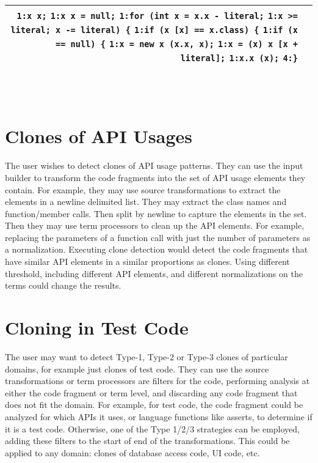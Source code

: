 \documentclass[]{article}
\begin{document}
\begin{minipage}{\textwidth}
\begin{tabular}{rp{12.5cm}}
			\verb|1:x x;|\newline
			\verb|1:x x = null;|\newline
			\verb|1:for (int x = x.x - literal;|\newline
			\verb|1:x >= literal; x -= literal) {|\newline
			\verb|1:if (x [x] == x.class) {|\newline
			\verb|1:if (x == null) {|\newline
			\verb|1:x = new x (x.x, x);|\newline
			\verb|1:x = (x) x [x + literal];|\newline
			\verb|1:x.x (x);|\newline
			\verb|4:}| \\
			\bottomrule[2pt]
		\end{tabular}
	\end{minipage}\\\\
	
	\newpage
	\section{Clones of API Usages}
	The user wishes to detect clones of API usage patterns.  They can use the input builder to transform the code fragments into the set of API usage elements they contain.  For example, they may use source transformations to extract the elements in a newline delimited list.  They may extract the class names and function/member calls.  Then split by newline to capture the elements in the set.  Then they may use term processors to clean up the API elements.  For example, replacing the parameters of a function call with just the number of parameters as a normalization.  Executing clone detection would detect the code fragments that have similar API elements in a similar proportions as clones.  Using different threshold, including different API elements, and different normalizations on the terms could change the results.

	\newpage
	\section{Cloning in Test Code}
	The user may want to detect Type-1, Type-2 or Type-3 clones of particular domains, for example just clones of test code.  They can use the source transformations or term processors are filters for the code, performing analysis at either the code fragment or term level, and discarding any code fragment that does not fit the domain.  For example, for test code, the code fragment could be analyzed for which APIs it uses, or language functions like asserts, to determine if it is a test code.  Otherwise, one of the Type 1/2/3 strategies can be employed, adding these filters to the start of end of the transformations.  This could be applied to any domain: clones of database access code, UI code, etc.
	
\end{document}
